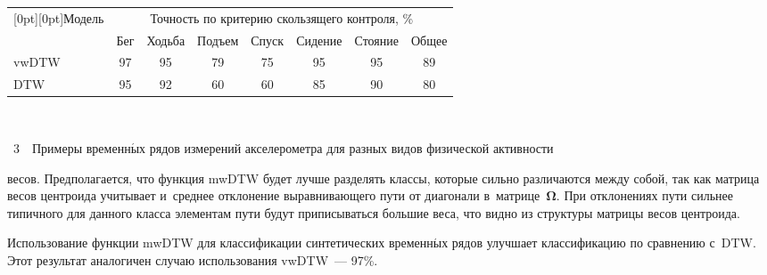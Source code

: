 \begin{multicols}{2}
\begin{table*}[b]
\begin{center}
\tabcolsep=14pt
\begin{tabular}{|l|c|c|c|c|c|c|c|}
\hline %
        \multicolumn{1}{|c|}{\raisebox{-6pt}[0pt][0pt]{Модель}} &\multicolumn{7}{c|}{Точность по критерию
        скользящего контроля, \%}\\
        \cline{2-8}
        &{Бег} & {Ходьба} & {Подъем} & {Спуск} & {Сидение} & {Стояние}& {Общее} \\
        \hline
 vwDTW  & 
        97 & 95 & 79 & 75 & 95 & 95 & 89\\
               DTW~\cite{Goncharov}
         & 
        95 & 92 & 60 & 60 & 85 & 90 & 80\\
        \hline
        \end{tabular}
\end{center}
\end{table*}

\pagebreak

 \noindent
 \begin{center}  %
 \vspace*{1pt}
 \mbox{%
 \epsfxsize=71.691mm
 }


\end{center} 
\vspace*{3pt}

\noindent
{{\figurename~3}\ \ \small{Примеры временн$\acute{\mbox{ы}}$х рядов измерений акселерометра для разных видов 
физической активности}}


 \vspace*{9pt}

\addtocounter{figure}{1}


\noindent
 весов. Предполагается, что функция mwDTW будет лучше разделять 
классы, которые сильно различаются между собой, так как матрица весов центроида 
учитывает и~среднее отклонение выравнивающего пути от диагонали 
в~матрице~$\boldsymbol{\Omega}$. При отклонениях пути сильнее типичного 
для данного класса элементам пути будут приписываться большие веса, что видно 
из структуры матрицы весов центроида.



Использование функции mwDTW для классификации синтетических временн$\acute{\mbox{ы}}$х 
рядов улучшает классификацию по сравнению с~DTW. Этот результат аналогичен случаю 
использования vwDTW~--- 97\%.



\end{multicols}
